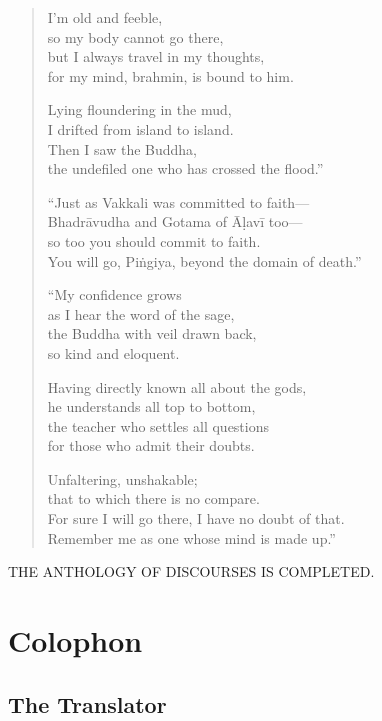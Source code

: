 \documentclass[12pt,openany]{book}%
\newcommand*{\scendbook}[1]{\begin{center}\uppercase{#1}\end{center}}
\let\oldbackmatter\backmatter
\renewcommand{\backmatter}{%
\chapterfont{\setstretch{.85}\normalfont\centering}%
\sectionfont{\setstretch{.85}\Semiboldsubheadfont}%
\oldbackmatter}
\begin{document}
\begin{verse}
I’m old and feeble, \\
so my body cannot go there, \\
but I always travel in my thoughts, \\
for my mind, brahmin, is bound to him. 

Lying floundering in the mud, \\
I drifted from island to island. \\
Then I saw the Buddha, \\
the undefiled one who has crossed the flood.” 

“Just as Vakkali was committed to faith—\\
\textsanskrit{Bhadrāvudha} and Gotama of \textsanskrit{Āḷavī} too—\\
so too you should commit to faith. \\
You will go, \textsanskrit{Piṅgiya}, beyond the domain of death.” 

“My confidence grows \\
as I hear the word of the sage, \\
the Buddha with veil drawn back, \\
so kind and eloquent. 

Having directly known all about the gods, \\
he understands all top to bottom, \\
the teacher who settles all questions \\
for those who admit their doubts. 

Unfaltering, unshakable; \\
that to which there is no compare. \\
For sure I will go there, I have no doubt of that. \\
Remember me as one whose mind is made up.” 

%
\end{verse}

\scendbook{The Anthology of Discourses is completed. }

%
\backmatter%
%
\chapter*{Colophon}

\section*{The Translator}
\end{document}
